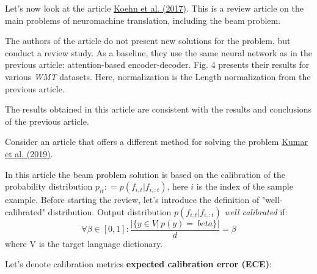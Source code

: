 \documentclass[a4paper,14pt]{extarticle}
\newcommand{\bibref}[3]{\hyperlink{#1}{#2 (#3)}}
\begin{document}
	Let's now look at the article \bibref{six_chall}{Koehn et al.}{2017}. This is a review article on the main problems of neuromachine translation, including the beam problem.
	
	\begin{figure}[t]
	\end{figure}
	
	The authors of the article do not present new solutions for the problem, but conduct a review study. As a baseline, they use the same neural network as in the previous article: attention-based encoder-decoder. Fig. 4 presents their results for various \textit{WMT} datasets. Here, normalization is the Length normalization from the previous article.
	
	The results obtained in this article are consistent with the results and conclusions of the previous article.
	
	Consider an article that offers a different method for solving the problem \bibref{calibration}{Kumar et al.}{2019}.

	In this article the beam problem solution is based on the calibration of the probability distribution $p_{it}: = p(f_{i, t} | f_{i,:t})$, here $i$ is the index of the sample example. Before starting the review, let's introduce the definition of "well-calibrated" distribution. Output distribution $p (f_{i, t} | f_{i, :t})$ \textit{well calibrated} if:
	\[
		\forall \beta \in [0, 1]: \frac{ | \{ y \in V |\, p(y) = \ beta \} | }{d}=\beta
	\]
	where V is the target language dictionary.
	
	Let's denote calibration metrics \textbf{expected calibration error (ECE)}:
	
\end{document}
